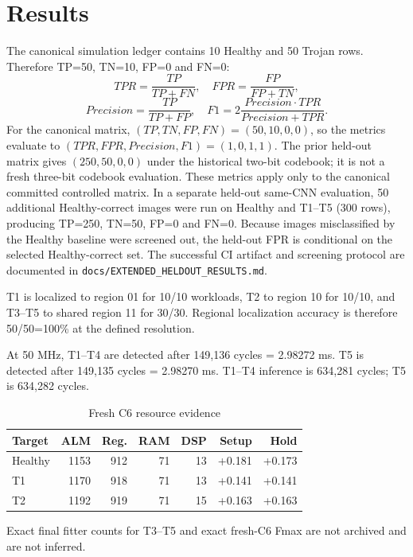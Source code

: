 \documentclass[conference]{IEEEtran}
\begin{document}
\section{Results}
The canonical simulation ledger contains 10 Healthy and 50 Trojan rows. Therefore TP=50, TN=10, FP=0 and FN=0:
\begin{equation}
TPR=\frac{TP}{TP+FN},\quad FPR=\frac{FP}{FP+TN},
\end{equation}
\begin{equation}
Precision=\frac{TP}{TP+FP},\quad F1=2\frac{Precision\cdot TPR}{Precision+TPR}.
\end{equation}
For the canonical matrix, $(TP,TN,FP,FN)=(50,10,0,0)$, so the metrics evaluate to $(TPR,FPR,Precision,F1)=(1,0,1,1)$. The prior held-out matrix gives $(250,50,0,0)$ under the historical two-bit codebook; it is not a fresh three-bit codebook evaluation.
These metrics apply only to the canonical committed controlled matrix. In a separate held-out same-CNN evaluation, 50 additional Healthy-correct images were run on Healthy and T1--T5 (300 rows), producing TP=250, TN=50, FP=0 and FN=0. Because images misclassified by the Healthy baseline were screened out, the held-out FPR is conditional on the selected Healthy-correct set. The successful CI artifact and screening protocol are documented in \texttt{docs/EXTENDED\_HELDOUT\_RESULTS.md}.

T1 is localized to region 01 for 10/10 workloads, T2 to region 10 for 10/10, and T3--T5 to shared region 11 for 30/30. Regional localization accuracy is therefore 50/50=100\% at the defined resolution.

At 50 MHz, T1--T4 are detected after 149,136 cycles = 2.98272 ms. T5 is detected after 149,135 cycles = 2.98270 ms. T1--T4 inference is 634,281 cycles; T5 is 634,282 cycles.

\begin{table}[t]
\centering
\caption{Fresh C6 resource evidence}
\begin{tabular}{lrrrrrr}
\toprule
Target & ALM & Reg. & RAM & DSP & Setup & Hold\\
\midrule
Healthy & 1153 & 912 & 71 & 13 & +0.181 & +0.173\\
T1 & 1170 & 918 & 71 & 13 & +0.141 & +0.141\\
T2 & 1192 & 919 & 71 & 15 & +0.163 & +0.163\\
\bottomrule
\end{tabular}
\end{table}
Exact final fitter counts for T3--T5 and exact fresh-C6 Fmax are not archived and are not inferred.
\end{document}
